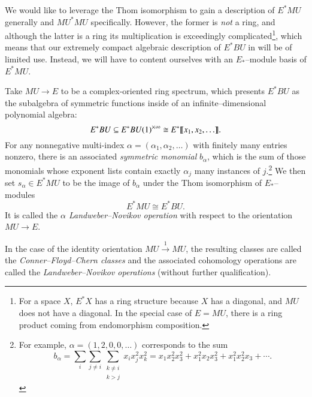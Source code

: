 We would like to leverage the Thom isomorphism to gain a description of $E^* MU$ generally and $MU^* MU$ specifically.  However, the former is \emph{not} a ring, and although the latter is a ring its multiplication is exceedingly complicated\footnote{For a space $X$, $E^* X$ has a ring structure because $X$ has a diagonal, and $MU$ does not have a diagonal.  In the special case of $E = MU$, there is a ring product coming from endomorphism composition.}, which means that our extremely compact algebraic description of $E^* BU$ in  will be of limited use.  Instead, we will have to content ourselves with an $E_*$--module basis of $E^* MU$.
\begin{definition}
Take $MU \to E$ to be a complex-oriented ring spectrum, which presents $E^* BU$ as the subalgebra of symmetric functions inside of an infinite--dimensional polynomial algebra: \[E^* BU \subseteq E^* BU(1)^{\times \infty} \cong E^*\llbracket{x_1, x_2, \ldots}\rrbracket.\]  For any nonnegative multi-index $\alpha = (\alpha_1, \alpha_2, \ldots)$ with finitely many entries nonzero, there is an associated \textit{symmetric monomial} $b_\alpha$, which is the sum of those monomials whose exponent lists contain exactly $\alpha_j$ many instances of $j$.\footnote{For example, $\alpha = (1, 2, 0, 0, \ldots)$ corresponds to the sum \[b_\alpha = \sum_i \sum_{j \ne i} \sum_{\substack{k \ne i \\ k > j}} x_i x_j^2 x_k^2 = x_1 x_2^2 x_3^2 + x_1^2 x_2 x_3^2 + x_1^2 x_2^2 x_3 + \cdots.\]}  We then set $s_\alpha \in E^* MU$ to be the image of $b_\alpha$ under the Thom isomorphism of $E_*$--modules \[E^* MU \cong E^* BU.\]  It is called the \textit{$\alpha${\th} Landweber--Novikov operation} with respect to the orientation $MU \to E$.
\end{definition}

\begin{definition}
In the case of the identity orientation $MU \xrightarrow{1} MU$, the resulting classes are called the \textit{Conner--Floyd--Chern classes} and the associated cohomology operations are called the \textit{Landweber--Novikov operations} (without further qualification).
\end{definition}

